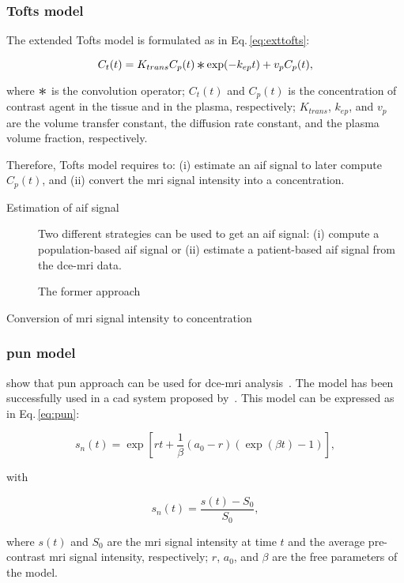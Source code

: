 \subsubsection{Tofts model}

The extended Tofts model is formulated as in Eq.\,\eqref{eq:exttofts}:

\begin{equation}
  C_t(t) = K_{trans} C_p(t) \Conv \exp(-k_{ep}t) + v_p C_p(t),
  \label{eq:exttofts}
\end{equation}

\noindent where $\Conv$ is the convolution operator; $C_t(t)$ and $C_p(t)$ is the concentration of contrast agent in the tissue and in the plasma, respectively; $K_{trans}$, $k_{ep}$, and $v_p$ are the volume transfer constant, the diffusion rate constant, and the plasma volume fraction, respectively.

Therefore, Tofts model requires to:
(i) estimate an \ac{aif} signal to later compute $C_p(t)$, and
(ii) convert the \ac{mri} signal intensity into a concentration.

\begin{description}
  \item[Estimation of \ac{aif} signal] Two different strategies can be used to get an \ac{aif} signal:
    (i) compute a population-based \ac{aif} signal or
    (ii) estimate a patient-based \ac{aif} signal from the \ac{dce}-\ac{mri} data.
    
    The former approach
  \item[Conversion of \ac{mri} signal intensity to concentration]
\end{description}

\subsubsection{\acs*{pun} model}

\citeauthor{gliozzi2011phenomenological} show that \ac{pun} approach can be used for \ac{dce}-\ac{mri} analysis~\citep{gliozzi2011phenomenological}.
The model has been successfully used in a \ac{cad} system proposed by~\cite{giannini2015fully}.
This model can be expressed as in Eq.\,\eqref{eq:pun}:

\begin{equation}
  s_n(t) = \exp\left[rt + \frac{1}{\beta} \left( a_0 - r \right) \left( \exp(\beta t) - 1 \right) \right],
  \label{eq:pun}
\end{equation}

\noindent with

\begin{equation}
  s_n(t) = \frac{s(t) - S_0}{S_0},
  \label{eq:enh}
\end{equation}

\noindent where $s(t)$ and $S_0$ are the \ac{mri} signal intensity at time $t$ and the average pre-contrast \ac{mri} signal intensity, respectively; $r$, $a_0$, and $\beta$ are the free parameters of the model.

\subsubsection{}

